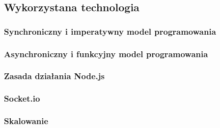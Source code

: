 % 

\subsection{Wykorzystana technologia}

\subsubsection{Synchroniczny i imperatywny model programowania}

\subsubsection{Asynchroniczny i funkcyjny model programowania}

\subsubsection{Zasada działania Node.js}

\subsubsection{Socket.io}

\subsubsection{Skalowanie}

